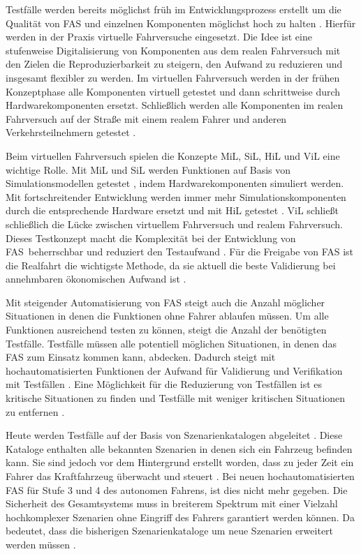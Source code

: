Testfälle werden bereits möglichst früh im Entwicklungsprozess erstellt um die Qualität von \ac{FAS} und einzelnen Komponenten möglichst hoch zu halten \cite{wachenfeld2015freigabe}. Hierfür werden in der Praxis virtuelle Fahrversuche eingesetzt. Die Idee ist eine stufenweise Digitalisierung von Komponenten aus dem realen Fahrversuch mit den Zielen die Reproduzierbarkeit zu steigern, den Aufwand zu reduzieren und insgesamt flexibler zu werden. Im virtuellen Fahrversuch werden in der frühen Konzeptphase alle Komponenten virtuell getestet und dann schrittweise durch Hardwarekomponenten ersetzt. Schließlich werden alle Komponenten im realen Fahrversuch auf der Straße mit einem realem Fahrer und anderen Verkehrsteilnehmern getestet \cite{hakuli2015virtuelle}.

Beim virtuellen Fahrversuch spielen die Konzepte \ac{MiL}, \ac{SiL}, \ac{HiL} und \ac{ViL} eine wichtige Rolle. Mit \ac{MiL} und \ac{SiL} werden Funktionen auf Basis von Simulationsmodellen getestet \cite{berg2015vehicle}, indem Hardwarekomponenten simuliert werden. Mit fortschreitender Entwicklung werden immer mehr Simulationskomponenten durch die entsprechende Hardware ersetzt und mit \ac{HiL} getestet \cite{hakuli2015virtuelle}. \ac{ViL} schließt schließlich die Lücke zwischen virtuellem Fahrversuch und realem Fahrversuch. Dieses Testkonzept macht die Komplexität bei der Entwicklung von \ac{FAS} beherrschbar und reduziert den Testaufwand \cite{schwab2014durchgangige}. Für die Freigabe von \ac{FAS} ist die Realfahrt die wichtigste Methode, da sie aktuell die beste Validierung bei annehmbaren ökonomischen Aufwand ist \cite{wachenfeld2015freigabe}.

Mit steigender Automatisierung von \ac{FAS} steigt auch die Anzahl möglicher Situationen in denen die Funktionen ohne Fahrer ablaufen müssen. Um alle Funktionen ausreichend testen zu können, steigt die Anzahl der benötigten Testfälle. Testfälle müssen alle potentiell möglichen Situationen, in denen das \ac{FAS} zum Einsatz kommen kann, abdecken. Dadurch steigt mit hochautomatisierten Funktionen der Aufwand für Validierung und Verifikation mit Testfällen \cite{bach2017reactive}. Eine Möglichkeit für die Reduzierung von Testfällen ist es kritische Situationen zu finden und Testfälle mit weniger kritischen Situationen zu entfernen \cite{wachenfeld2015freigabe}.

Heute werden Testfälle auf der Basis von Szenarienkatalogen  abgeleitet \cite{putz2017system}. Diese Kataloge enthalten alle bekannten Szenarien in denen sich ein Fahrzeug befinden kann. Sie sind jedoch vor dem Hintergrund erstellt worden, dass zu jeder Zeit ein Fahrer das Kraftfahrzeug überwacht und steuert \cite{wachenfeld2015freigabe}. Bei neuen hochautomatisierten \ac{FAS} für Stufe 3 und 4 des autonomen Fahrens, ist dies nicht mehr gegeben. Die Sicherheit des Gesamtsystems muss in breiterem Spektrum mit einer Vielzahl hochkomplexer Szenarien ohne Eingriff des Fahrers garantiert werden können. Da bedeutet, dass die bisherigen Szenarienkataloge um neue Szenarien erweitert werden müssen \cite{surmund2018neue}.

